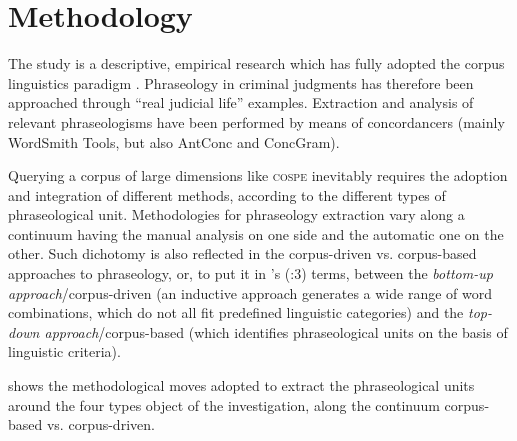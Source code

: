 \documentclass[output=paper]{LSP/langsci}
\begin{document}
\section{Methodology}
The study is a descriptive, empirical research which has fully adopted the corpus linguistics paradigm \citep[see][]{McEnery2006}. Phraseology in criminal judgments has therefore been approached through “real judicial life” examples. Extraction and analysis of relevant phraseologisms have been performed by means of concordancers (mainly WordSmith Tools, but also AntConc and ConcGram).

Querying a corpus of large dimensions like \textsc{cospe} inevitably requires the adoption and integration of different methods, according to the different types of phraseological unit. Methodologies for phraseology extraction vary along a continuum having the manual analysis on one side and the automatic one on the other. Such dichotomy is also reflected in the corpus-driven vs. corpus-based approaches to phraseology, or, to put it in \citeauthor{Granger2005}'s (\citeyear{Granger2005}:3) terms, between the \textit{bottom-up approach}/corpus-driven (an inductive approach generates a wide range of word combinations, which do not all fit predefined linguistic categories) and the \textit{top-down approach}/corpus-based (which identifies phraseological units on the basis of linguistic criteria).

 shows the methodological moves adopted to extract the phraseological units around the four types object of the investigation, along the continuum corpus-based vs. corpus-driven.
\end{document}
